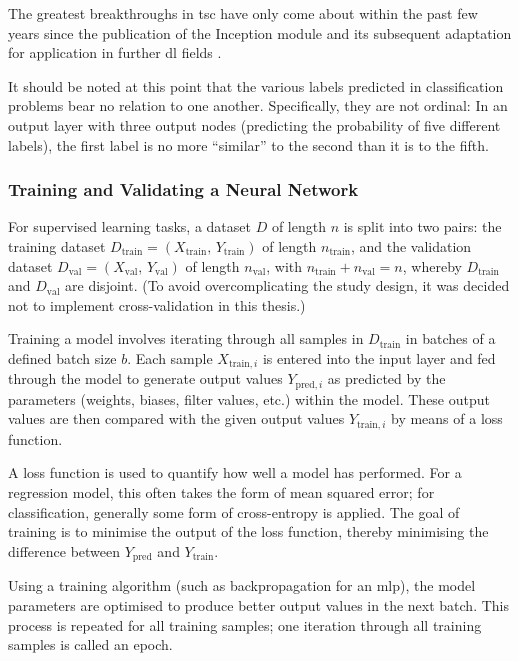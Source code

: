 The greatest breakthroughs in \ac{tsc} have only come about within the past few years since the publication of the Inception module \cite[]{szegedy_going_2014} and its subsequent adaptation for application in further \ac{dl} fields \cite{ismail_fawaz_deep_2019, fawaz_inceptiontime_2019}.

It should be noted at this point that the various labels predicted in classification problems bear no relation to one another. Specifically, they are not ordinal: In an output layer with three output nodes (predicting the probability of five different labels), the first label is no more ``similar'' to the second than it is to the fifth.

\subsubsection{Training and Validating a Neural Network}
For supervised learning tasks, a dataset \(D\) of length \(n\) is split into two pairs: the training dataset \(D_{\text{train}} = \left(X_{\text{train}},\,Y_{\text{train}}\right)\) of length \(n_{\text{train}}\), and the validation dataset \(D_{\text{val}} = \left(X_{\text{val}},\,Y_{\text{val}}\right)\) of length \(n_{\text{val}}\), with \(n_{\text{train}} + n_{\text{val}} = n\), whereby \(D_{\text{train}}\) and \(D_{\text{val}}\) are disjoint. (To avoid overcomplicating the study design, it was decided not to implement cross-validation in this thesis.)

Training a model involves iterating through all samples in \(D_{\text{train}}\) in batches of a defined batch size \(b\). Each sample \(X_{\text{train}, i}\) is entered into the input layer and fed through the model to generate output values \(Y_{\text{pred}, i}\) as predicted by the parameters (weights, biases, filter values, etc.) within the model. These output values are then compared with the given output values \(Y_{\text{train}, i}\) by means of a loss function.

A loss function is used to quantify how well a model has performed. For a regression model, this often takes the form of mean squared error; for classification, generally some form of cross-entropy is applied. The goal of training is to minimise the output of the loss function, thereby minimising the difference between \(Y_{\text{pred}}\) and \(Y_{\text{train}}\).

Using a training algorithm (such as backpropagation for an \ac{mlp}), the model parameters are optimised to produce better output values in the next batch. This process is repeated for all training samples; one iteration through all training samples is called an epoch. \cite[]{kirk_thoughtful_2017}


